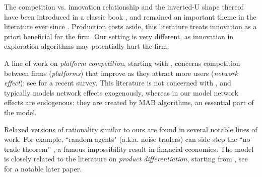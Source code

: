  The competition vs. innovation relationship and the inverted-U shape thereof have been introduced in a classic book \citep{Schumpeter-42}, and remained an important theme in the literature ever since \cite[\eg][]{Aghion-QJE05,Vives-08}. Production costs aside, this literature treats innovation as a priori beneficial for the firm. Our setting is very different, as innovation in exploration algorithms may potentially hurt the firm.

A line of work on \emph{platform competition}, starting with \cite{Rysman09}, concerns competition between firms (\emph{platforms}) that improve as they attract more users (\emph{network effect}); see \citet{Weyl-White-14} for a recent survey. This literature is not concerned with \innovation, and typically models network effects exogenously, whereas in our model network effects are endogenous: they are created by MAB algorithms, an essential part of the model. 

Relaxed versions of rationality similar to ours are found in several notable lines of work. For example, ``random agents" (a.k.a. noise traders) can side-step the ``no-trade theorem'' \citep{Milgrom-Stokey-82}, a famous impossibility result in financial economics. The \SoftMaxRandom model is closely related to the literature on \emph{product differentiation}, starting from \cite{Hotelling-29}, see \cite{Perloff-Salop-85} for a notable later paper.

